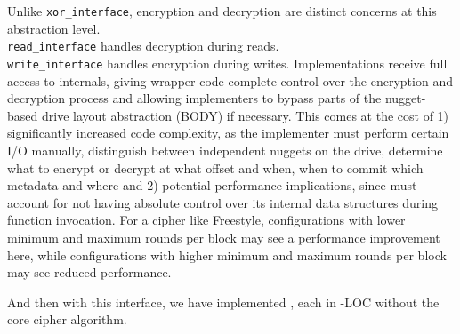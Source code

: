 
 Unlike
\texttt{xor\_interface}, encryption and decryption are distinct concerns at this
abstraction level. \\\texttt{read\_interface} handles decryption during reads.
\\\texttt{write\_interface} handles encryption during writes. Implementations
receive full access to \sys internals, giving wrapper code complete control over
the encryption and decryption process and allowing implementers to bypass parts
of the nugget-based drive layout abstraction (\ie BODY) if necessary. This comes
at the cost of 1) significantly increased code complexity, as the implementer
must perform certain I/O manually, distinguish between independent nuggets on
the drive, determine what to encrypt or decrypt at what offset and when, when to
commit which metadata and where and 2) potential performance implications, since
\sys must account for not having absolute control over its internal data
structures during function invocation. For a cipher like Freestyle,
configurations with lower minimum and maximum rounds per block may see a
performance improvement here, while configurations with higher minimum and
maximum rounds per block may see reduced performance.

And then with this interface, we have implemented , each in \xxx-\xxx LOC without the core cipher
algorithm.




